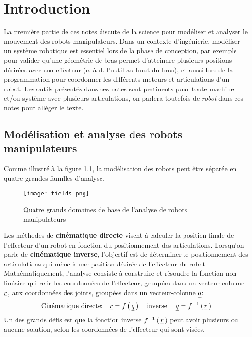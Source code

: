 \chapter{Introduction}

La première partie de ces notes discute de la science pour modéliser et analyser le mouvement des robots manipulateurs. Dans un contexte d'ingénierie, modéliser un système robotique est essentiel lors de la phase de conception, par exemple pour valider qu'une géométrie de bras permet d'atteindre plusieurs positions désirées avec son effecteur (c.-à-d. l'outil au bout du bras), et aussi lors de la programmation pour coordonner les différents moteurs et articulations d'un robot. Les outils présentés dans ces notes sont pertinents pour toute machine et/ou système avec plusieurs articulations, on parlera toutefois de \textit{robot} dans ces notes pour alléger le texte.


\section{Modélisation et analyse des robots manipulateurs}

Comme illustré à la figure \ref{fig:fields}, la modélisation des robots peut être séparée en quatre grandes familles d'analyse.

\begin{figure}[H]
	\centering
	\texttt{[image: fields.png]}
	\caption{Quatre grands domaines de base de l'analyse de robots manipulateurs  }
	\label{fig:fields}
\end{figure}

Les méthodes de \textbf{cinématique directe} visent à calculer la position finale de l'effecteur d'un robot en fonction du positionnement des articulations. Lorsqu'on parle de \textbf{cinématique inverse}, l'objectif est de déterminer le positionnement des articulations qui mène à une position désirée de l'effecteur du robot. Mathématiquement, l'analyse consiste à construire et résoudre la fonction non linéaire qui relie les coordonnées de l'effecteur, groupées dans un vecteur-colonne $\underline{r}$, aux coordonnées des joints, groupées dans un vecteur-colonne $\underline{q}$:
\begin{equation}
	\text{Cinématique directe:}  \quad \underline{r} = f\left( \, \underline{q} \, \right)  \quad  \text{inverse:} \quad \underline{q} = f^{-1}\left( \, \underline{r}  \, \right)
\end{equation}
Un des grands défis est que la fonction inverse $f^{-1}\left( \, \underline{r}  \, \right)$ peut avoir plusieurs ou aucune solution, selon les coordonnées de l'effecteur qui sont visées.

